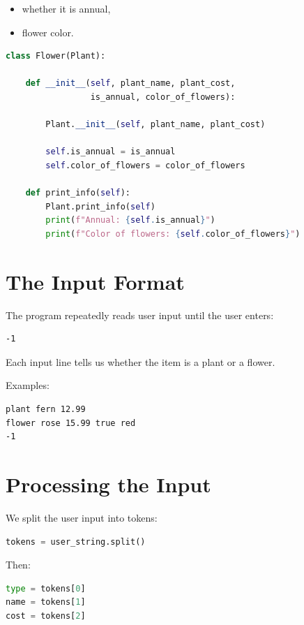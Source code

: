 \documentclass[11pt]{article}
\begin{document}
\begin{itemize}
    \item whether it is annual,
    \item flower color.
\end{itemize}

\begin{lstlisting}[language=Python]
class Flower(Plant):

    def __init__(self, plant_name, plant_cost,
                 is_annual, color_of_flowers):

        Plant.__init__(self, plant_name, plant_cost)

        self.is_annual = is_annual
        self.color_of_flowers = color_of_flowers

    def print_info(self):
        Plant.print_info(self)
        print(f"Annual: {self.is_annual}")
        print(f"Color of flowers: {self.color_of_flowers}")
\end{lstlisting}

\section{The Input Format}

The program repeatedly reads user input until the user enters:

\begin{lstlisting}
-1
\end{lstlisting}

Each input line tells us whether the item is a plant or a flower.

Examples:

\begin{lstlisting}
plant fern 12.99
flower rose 15.99 true red
-1
\end{lstlisting}

\section{Processing the Input}

We split the user input into tokens:

\begin{lstlisting}[language=Python]
tokens = user_string.split()
\end{lstlisting}

Then:

\begin{lstlisting}[language=Python]
type = tokens[0]
name = tokens[1]
cost = tokens[2]
\end{lstlisting}
\end{document}
